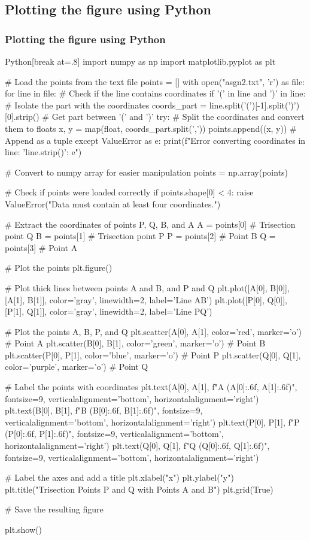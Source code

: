 \documentclass{beamer}
\theoremstyle{remark}
\numberwithin{equation}{section}
\begin{document}
\subsection{Plotting the figure using Python}
\begin{frame}
\frametitle{Plotting the figure using Python}

\begin{mintedbox}{Python}[break at=.8\textheight]
import numpy as np
import matplotlib.pyplot as plt

# Load the points from the text file
points = []
with open("asgn2.txt", 'r') as file:
    for line in file:
        # Check if the line contains coordinates
        if '(' in line and ')' in line:
            # Isolate the part with the coordinates
            coords_part = line.split('(')[-1].split(')')[0].strip()  # Get part between '(' and ')'
            try:
                # Split the coordinates and convert them to floats
                x, y = map(float, coords_part.split(','))
                points.append((x, y))  # Append as a tuple
            except ValueError as e:
                print(f"Error converting coordinates in line: '{line.strip()}': {e}")

# Convert to numpy array for easier manipulation
points = np.array(points)

# Check if points were loaded correctly
if points.shape[0] < 4:
    raise ValueError("Data must contain at least four coordinates.")

# Extract the coordinates of points P, Q, B, and A
A = points[0]  # Trisection point Q
B = points[1]  # Trisection point P
P = points[2]  # Point B
Q = points[3]  # Point A


# Plot the points
plt.figure()

# Plot thick lines between points A and B, and P and Q
plt.plot([A[0], B[0]], [A[1], B[1]], color='gray', linewidth=2, label='Line AB')
plt.plot([P[0], Q[0]], [P[1], Q[1]], color='gray', linewidth=2, label='Line PQ')

# Plot the points A, B, P, and Q
plt.scatter(A[0], A[1], color='red', marker='o')  # Point A
plt.scatter(B[0], B[1], color='green', marker='o')  # Point B
plt.scatter(P[0], P[1], color='blue', marker='o')   # Point P
plt.scatter(Q[0], Q[1], color='purple', marker='o')  # Point Q

# Label the points with coordinates
plt.text(A[0], A[1], f"A ({A[0]:.6f}, {A[1]:.6f})", fontsize=9, verticalalignment='bottom', horizontalalignment='right')
plt.text(B[0], B[1], f"B ({B[0]:.6f}, {B[1]:.6f})", fontsize=9, verticalalignment='bottom', horizontalalignment='right')
plt.text(P[0], P[1], f"P ({P[0]:.6f}, {P[1]:.6f})", fontsize=9, verticalalignment='bottom', horizontalalignment='right')
plt.text(Q[0], Q[1], f"Q ({Q[0]:.6f}, {Q[1]:.6f})", fontsize=9, verticalalignment='bottom', horizontalalignment='right')

# Label the axes and add a title
plt.xlabel("x")
plt.ylabel("y")
plt.title("Trisection Points P and Q with Points A and B")
plt.grid(True)

# Save the resulting figure

plt.show()
	
	\end{mintedbox}
\end{frame}
\end{document}
